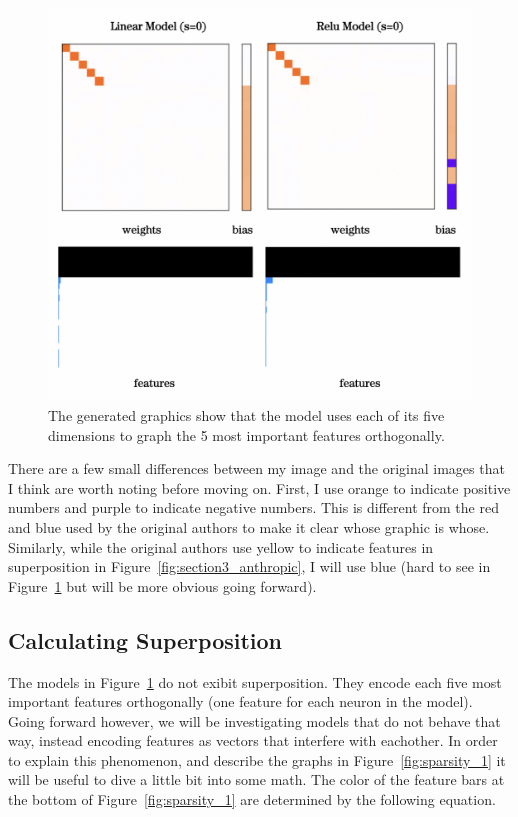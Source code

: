 \documentclass{article} %
\begin{document}
\begin{figure}[h]
    \centering
    \includegraphics[width=0.5\linewidth]{demonstrating_superposition/images/relu_linear_0_sparsity.png}
    \captionsetup{font=footnotesize, width=0.7\linewidth} %
    \caption{The generated graphics show that the model uses each of its five 
    dimensions to graph the 5 most important features orthogonally.}
    \label{fig:relu_linear_0}
\end{figure}

There are a few small differences between my image and the original images that
I think are worth noting before moving on. First, I use orange to indicate
positive numbers and purple to indicate negative numbers. This is different from
the red and blue used by the original authors to make it clear whose graphic is
whose. Similarly, while the original authors use yellow to indicate features in
superposition in Figure~\ref{fig:section3_anthropic}, I will use blue (hard to
see in Figure~\ref{fig:relu_linear_0} but will be more obvious going forward).

\subsection{Calculating Superposition}

The models in Figure~\ref{fig:relu_linear_0} do not exibit superposition. They
encode each five most important features orthogonally (one feature for each
neuron in the model). Going forward however, we will be investigating models
that do not behave that way, instead encoding features as vectors that interfere
with eachother. In order to explain this phenomenon, and describe the graphs in 
Figure~\ref{fig:sparsity_1} it will be useful to dive a little bit into some
math. The color of the feature bars at the bottom of Figure~\ref{fig:sparsity_1}
are determined by the following equation.
\end{document}
